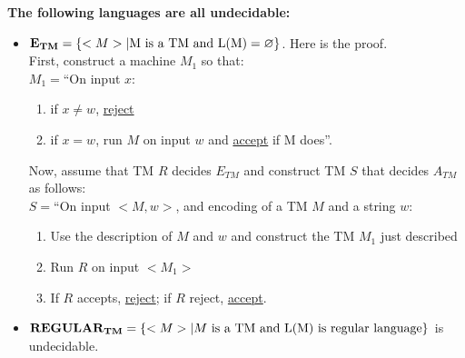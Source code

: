 \documentclass[a4paper]{article}
\begin{document}
{\bf The following languages are all undecidable:}
\begin{itemize}
    \item ${\bf E_{TM}}=\left\{ <M>| \text{M is a TM and L(M)}=\varnothing \right\}$. Here is the proof. \\
   First, construct a machine $M_1$ so that: \\
   $M_1=$``On input $x$:
   \begin{enumerate}
     \item if $x\neq w$, \underline{reject}
     \item if $x=w$, run $M$ on input $w$ and \underline{accept} if M does''.
   \end{enumerate}
   Now, assume that TM $R$ decides $E_{TM}$ and construct TM $S$ that decides $A_{TM}$ as follows: \\
   $S=$``On input $<M,w>$, and encoding of a TM $M$ and a string $w$:
   \begin{enumerate}
     \item Use the description of $M$ and $w$ and construct the TM $M_1$ just described
     \item Run $R$ on input $<M_1>$
     \item If $R$ accepts, \underline{reject}; if $R$ reject, \underline{accept}.
   \end{enumerate}
  \item ${\bf REGULAR_{TM} }=\left\{ <M>|M \text{ is a TM and L(M) is regular language} \right\}$ is undecidable. \\


\end{itemize}
\end{document}

